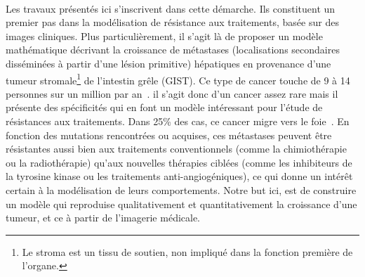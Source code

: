 \documentclass[main.tex]{subfiles}
\begin{document}
\paragraph{}
Les travaux présentés ici s'inscrivent dans cette démarche. Ils constituent un premier pas dans la modélisation de résistance aux traitements, basée sur des images cliniques. 
Plus particulièrement, il s'agit là de proposer un modèle mathématique décrivant la croissance de métastases 
(localisations secondaires disséminées à partir d'une lésion primitive)
hépatiques en provenance d'une  
tumeur stromale\footnote{Le stroma est un tissu de soutien, non impliqué dans la fonction première de l'organe.} de l'intestin grêle
(GIST).
Ce type de cancer touche de 9 à 14 personnes sur un million par an~\cite{Nilsson2005}. 
il s'agit donc d'un cancer assez rare mais il présente des spécificités qui en font un modèle intéressant pour l'étude de résistances aux traitements. 
Dans 25\% des cas, ce cancer migre vers le foie~\cite{dematteo2000}. 
En fonction des mutations rencontrées ou acquises, ces métastases peuvent être résistantes aussi bien aux traitements conventionnels (comme la chimiothérapie ou la radiothérapie) qu'aux nouvelles thérapies ciblées (comme les inhibiteurs de la tyrosine kinase ou les traitements anti-angiogéniques), ce qui donne un intérêt certain à la modélisation de leurs comportements. 
Notre but ici, est de construire un modèle qui reproduise qualitativement et quantitativement la croissance d'une tumeur, et ce à partir de l'imagerie médicale.
\end{document}
